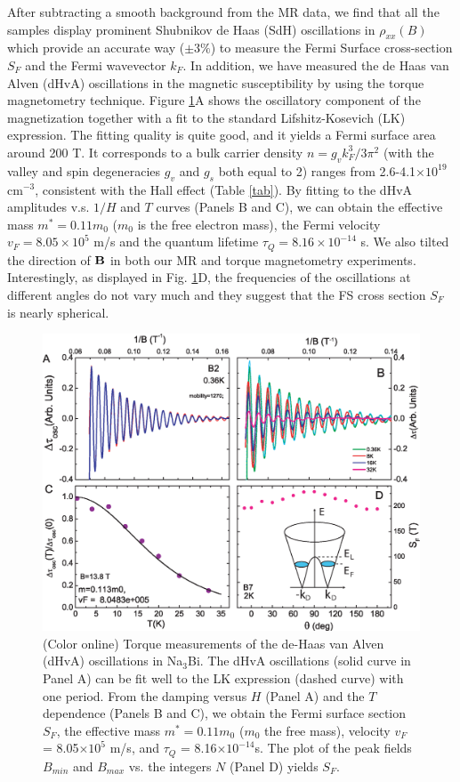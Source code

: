 After subtracting a smooth background from the MR data, we find that all the samples display prominent Shubnikov de Haas (SdH) oscillations in $\rho_{xx}(B)$ which provide an accurate way ($\pm3\%$) to measure the Fermi Surface cross-section $S_F$ and the Fermi wavevector $k_F$. In addition, we have measured the de Haas van Alven (dHvA) oscillations in the magnetic susceptibility by using the torque magnetometry technique. Figure \ref{figtorque}A shows the oscillatory component of the magnetization together with a fit to the standard Lifshitz-Kosevich (LK) expression. The fitting quality is quite good, and it yields a Fermi surface area around 200 T. It corresponds to a bulk carrier density $n = g_vk_F^3/3\pi^2$ (with the valley and spin degeneracies $g_v$ and $g_s$ both equal to 2) ranges from 2.6-4.1$\times 10^{19}$ cm$^{-3}$, consistent with the Hall effect (Table \ref{tab}). By fitting to the dHvA amplitudes v.s. $1/H$ and $T$ curves (Panels B and C), we can obtain the effective mass $m^* = 0.11 m_0$ ($m_0$ is the free electron mass),  the Fermi velocity $v_F = 8.05\times10^5$ m/s and the quantum lifetime $\tau_Q=8.16\times10^{-14}$ s. We also tilted the direction of $\bf B$ in both our MR and torque magnetometry experiments. Interestingly, as displayed in Fig. \ref{figtorque}D, the frequencies of the oscillations at different angles do not vary much and they suggest that the FS cross section $S_F$ is nearly spherical. 

\begin{figure}[!htbp]
  \begin{center}
\includegraphics[width=1\linewidth]{ch-na3bi/figures/FigTorqueA}
\caption{\label{figtorque} (Color online)
Torque measurements of the de-Haas van Alven (dHvA) oscillations in Na$_3$Bi. The dHvA oscillations (solid curve in Panel A) can be fit well to the LK expression (dashed curve) with one period. From the damping versus $H$ (Panel A) and the $T$ dependence (Panels B and C), we obtain the Fermi surface section $S_F$, the effective mass $m^* = 0.11 m_0$ ($m_0$ the free mass), velocity $v_F$ = 8.05$\times 10^5$ m/s, and $\tau_Q$ = 8.16$\times 10^{-14}$s. The plot of the peak fields $B_{min}$ and $B_{max}$ vs. the integers $N$ (Panel D) yields $S_F$. 
}
  \end{center}
\end{figure}

